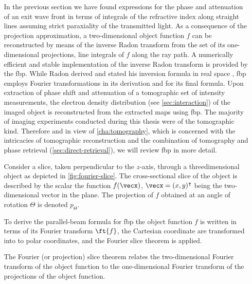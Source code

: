 \documentclass[
twoside,
openright,
titlepage,
numbers=noenddot,
headinclude,
fleqn,
a4paper,
footinclude=true,
cleardoublepage=empty,
abstractoff,
BCOR=5mm,
paper=a4,
fontsize=11pt,
british,ngerman,american,
]{scrreprt}
\begin{document}
In the previous section we have found expressions for the phase and
attenuation of an exit wave front in terms of integrals of the
refractive index along straight lines assuming strict paraxiality of
the transmitted light.  As a consequence of the projection
approximation, a two-dimensional object function $f$ can be
reconstructed by means of the inverse Radon transform from the set of
its one-dimensional projections, \ie{} line integrals of $f$ along the
ray path.  A numerically efficient and stable implementation of the
inverse Radon transform is provided by the \acf{fbp}.  While Radon
derived and stated his inversion formula in real space
\cite{Radon1917}, \ac{fbp} employs Fourier transformations in its
derivation and for its final formula.  Upon extraction of phase shift
and attenuation of a tomographic set of intensity measurements, the
electron density distribution (see \cref{sec:interaction}) of the
imaged object is reconstructed from the extracted maps using \ac{fbp}.
The majority of imaging experiments conducted during this thesis were
of the tomographic kind.  Therefore and in view of
\cref{cha:tomography}, which is concerned with the intricacies of
tomographic reconstruction and the combination of tomography and phase
retrieval (\cref{sec:direct-retrieval}), we will review \ac{fbp} in
more detail.

Consider a slice, taken perpendicular to the $z$-axis, through a
three\hyph dimensional object as depicted in \cref{fig:fourier-slice}.
The cross-sectional slice of the object is described by the scalar the
function $f(\vecx)$, $\vecx=(x,y)^{\intercal}$ being the
two-dimensional vector in the plane.  The projection of $f$ obtained
at an angle of rotation $\Theta$ is denoted $p_\Theta$.

To derive the parallel-beam formula for \ac{fbp} the object function
$f$ is written in terms of its Fourier transform $\ft{f}$, the
Cartesian coordinate are transformed into to polar coordinates, and
the Fourier slice theorem is applied.

The Fourier (or projection) slice theorem relates the two-dimensional
Fourier transform of the object function to the one-dimensional
Fourier transform of the projections of the object function.
\end{document}
